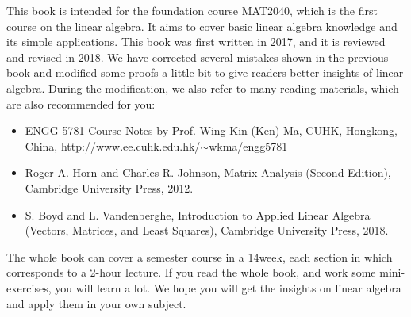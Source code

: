 This book is intended for the foundation course MAT2040, which is the first course on the linear algebra. It aims to cover basic linear algebra knowledge and its simple applications. This book was first written in 2017, and it is reviewed and revised in 2018. We have corrected several mistakes shown in the previous book and modified some proofs a little bit to give readers better insights of linear algebra.  During the modification, we also refer to many reading materials, which are also recommended for you:
\begin{itemize}
\item
ENGG 5781 Course Notes by Prof. Wing-Kin (Ken) Ma,  CUHK, Hongkong, China,  http://www.ee.cuhk.edu.hk/$\sim$wkma/engg5781
\item
Roger A. Horn and Charles R. Johnson, Matrix Analysis (Second Edition), Cambridge University Press, 2012.
\item
S. Boyd and L. Vandenberghe, Introduction to Applied Linear Algebra (Vectors, Matrices, and Least Squares), Cambridge University Press, 2018.
\end{itemize}
The whole book can cover a semester course in a 14week, each section in which corresponds to a 2-hour lecture. If you read the whole book, and work some mini-exercises, you will learn a lot. We hope you will get the insights on linear algebra and apply them in your own subject.



